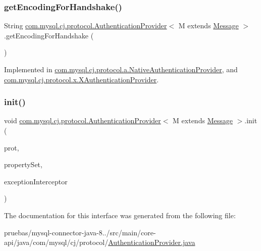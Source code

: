 \subsubsection{\texorpdfstring{get\+Encoding\+For\+Handshake()}{getEncodingForHandshake()}}
{\footnotesize\ttfamily String \mbox{\hyperlink{interfacecom_1_1mysql_1_1cj_1_1protocol_1_1_authentication_provider}{com.\+mysql.\+cj.\+protocol.\+Authentication\+Provider}}$<$ M extends \mbox{\hyperlink{interfacecom_1_1mysql_1_1cj_1_1protocol_1_1_message}{Message}} $>$.get\+Encoding\+For\+Handshake (\begin{DoxyParamCaption}{ }\end{DoxyParamCaption})}



Implemented in \mbox{\hyperlink{classcom_1_1mysql_1_1cj_1_1protocol_1_1a_1_1_native_authentication_provider_a27c5a8cd7397eb15934b3b3048dc161d}{com.\+mysql.\+cj.\+protocol.\+a.\+Native\+Authentication\+Provider}}, and \mbox{\hyperlink{classcom_1_1mysql_1_1cj_1_1protocol_1_1x_1_1_x_authentication_provider_adf03df5479398541ea3039c50956db0f}{com.\+mysql.\+cj.\+protocol.\+x.\+X\+Authentication\+Provider}}.

\mbox{\label{interfacecom_1_1mysql_1_1cj_1_1protocol_1_1_authentication_provider_a8806f98d0408eaad74edc0784fc78825}} 
\subsubsection{\texorpdfstring{init()}{init()}}
{\footnotesize\ttfamily void \mbox{\hyperlink{interfacecom_1_1mysql_1_1cj_1_1protocol_1_1_authentication_provider}{com.\+mysql.\+cj.\+protocol.\+Authentication\+Provider}}$<$ M extends \mbox{\hyperlink{interfacecom_1_1mysql_1_1cj_1_1protocol_1_1_message}{Message}} $>$.init (\begin{DoxyParamCaption}\item[{\mbox{\hyperlink{interfacecom_1_1mysql_1_1cj_1_1protocol_1_1_protocol}{Protocol}}$<$ M $>$}]{prot,  }\item[{\mbox{\hyperlink{interfacecom_1_1mysql_1_1cj_1_1conf_1_1_property_set}{Property\+Set}}}]{property\+Set,  }\item[{\mbox{\hyperlink{interfacecom_1_1mysql_1_1cj_1_1exceptions_1_1_exception_interceptor}{Exception\+Interceptor}}}]{exception\+Interceptor }\end{DoxyParamCaption})}



The documentation for this interface was generated from the following file\+:\begin{DoxyCompactItemize}
\item 
pruebas/mysql-\/connector-\/java-\/8../src/main/core-\/api/java/com/mysql/cj/protocol/\mbox{\hyperlink{_authentication_provider_8java}{Authentication\+Provider.\+java}}\end{DoxyCompactItemize}
